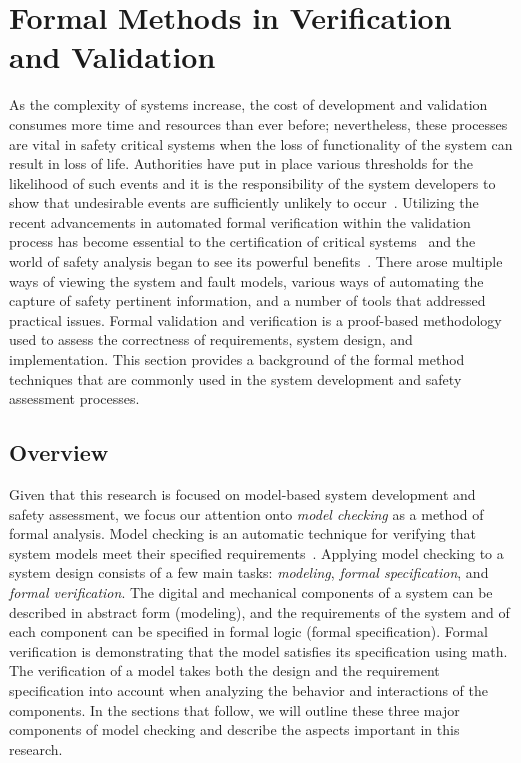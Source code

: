 \section{Formal Methods in Verification and Validation}
\label{sec:fm}
As the complexity of systems increase, the cost of development and validation consumes more time and resources than ever before; nevertheless, these processes are vital in safety critical systems when the loss of functionality of the system can result in loss of life. Authorities have put in place various thresholds for the likelihood of such events and it is the responsibility of the system developers to show that undesirable events are sufficiently unlikely to occur~\cite{faaSA}. Utilizing the recent advancements in automated formal verification within the validation process has become essential to the certification of critical systems~\cite{deptOfDefense,standard1999,prasad2005survey} and the world of safety analysis began to see its powerful benefits~\cite{hinchey2012industrial, liggesmeyer1998improving, coudert1993fault, Bozzano:2010:DSA:1951720,bozzano2003esacs}. There arose multiple ways of viewing the system and fault models, various ways of automating the capture of safety pertinent information, and a number of tools that addressed practical issues. Formal validation and verification is a proof-based methodology used to assess the correctness of requirements, system design, and implementation. This section provides a background of the formal method techniques that are commonly used in the system development and safety assessment processes.

\subsection{Overview}
Given that this research is focused on model-based system development and safety assessment, we focus our attention onto \emph{model checking} as a method of formal analysis. Model checking is an automatic technique for verifying that system models meet their specified requirements~\cite{clarke2018model}.  Applying model checking to a system design consists of a few main tasks: \emph{modeling}, \emph{formal specification}, and \emph{formal verification}. The digital and mechanical components of a system can be described in abstract form (modeling), and the requirements of the system and of each component can be specified in formal logic (formal specification). Formal verification is demonstrating that the model satisfies its specification using math. The verification of a model takes both the design and the requirement specification into account when analyzing the behavior and interactions of the components. In the sections that follow, we will outline these three major components of model checking and describe the aspects important in this research.

